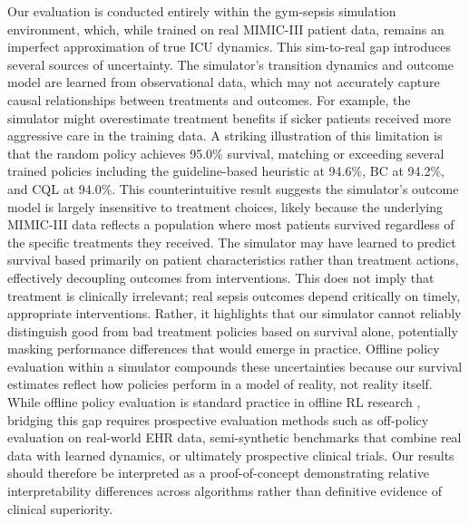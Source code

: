 Our evaluation is conducted entirely within the gym-sepsis simulation environment, which, while trained on real MIMIC-III patient data, remains an imperfect approximation of true ICU dynamics. This sim-to-real gap introduces several sources of uncertainty. The simulator's transition dynamics and outcome model are learned from observational data, which may not accurately capture causal relationships between treatments and outcomes. For example, the simulator might overestimate treatment benefits if sicker patients received more aggressive care in the training data. A striking illustration of this limitation is that the random policy achieves 95.0\% survival, matching or exceeding several trained policies including the guideline-based heuristic at 94.6\%, BC at 94.2\%, and CQL at 94.0\%. This counterintuitive result suggests the simulator's outcome model is largely insensitive to treatment choices, likely because the underlying MIMIC-III data reflects a population where most patients survived regardless of the specific treatments they received. The simulator may have learned to predict survival based primarily on patient characteristics rather than treatment actions, effectively decoupling outcomes from interventions. This does not imply that treatment is clinically irrelevant; real sepsis outcomes depend critically on timely, appropriate interventions. Rather, it highlights that our simulator cannot reliably distinguish good from bad treatment policies based on survival alone, potentially masking performance differences that would emerge in practice. Offline policy evaluation within a simulator compounds these uncertainties because our survival estimates reflect how policies perform in a model of reality, not reality itself. While offline policy evaluation is standard practice in offline RL research \citep{levine2020offline}, bridging this gap requires prospective evaluation methods such as off-policy evaluation on real-world EHR data, semi-synthetic benchmarks that combine real data with learned dynamics, or ultimately prospective clinical trials. Our results should therefore be interpreted as a proof-of-concept demonstrating relative interpretability differences across algorithms rather than definitive evidence of clinical superiority.

